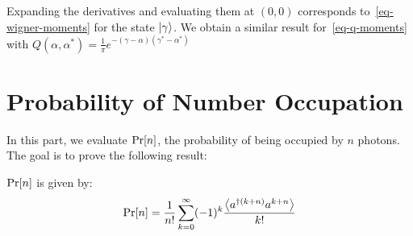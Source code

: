 Expanding the derivatives and evaluating them at $(0,0)$ corresponds to~\autoref{eq-wigner-moments} for the state $\ket{\gamma}$. We obtain a similar result for~\autoref{eq-q-moments} with $Q(\alpha, \alpha^*) =  \frac{1}{\pi} e^{-(\gamma - \alpha) (\gamma^* - \alpha^*)}$

\section{Probability of Number Occupation}

In this part, we evaluate $\text{Pr}[n]$, the probability of being occupied by $n$ photons. The goal is to prove the following result:
\begin{theorem}
    $\text{Pr}[n]$ is given by:
    \begin{equation} \label{eq_pr_n_moments}
    \text{Pr}[n] = \frac{1}{n!} \sum_{k=0}^\infty (-1)^k \frac{\left\langle a^{\dagger (k+n)} a^{k+n} \right\rangle}{k!}
    \end{equation}
\end{theorem}

